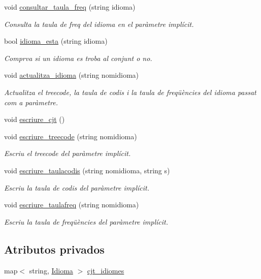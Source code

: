 \begin{DoxyCompactItemize}
void \hyperlink{class_cjt___idiomes_af0cfe6e69c1784af172fe825bdbe61f8}{consultar\+\_\+taula\+\_\+freq} (string idioma)
\begin{DoxyCompactList}\small\item\em Consulta la taula de freq del idioma en el paràmetre implícit. \end{DoxyCompactList}\item 
bool \hyperlink{class_cjt___idiomes_a4c46be5ecf3b12b3f481ace7d487fdc3}{idioma\+\_\+esta} (string idioma)
\begin{DoxyCompactList}\small\item\em Comprva si un idioma es troba al conjunt o no. \end{DoxyCompactList}\item 
void \hyperlink{class_cjt___idiomes_a7aad6974355b73c50c2d5c1edc0a5c14}{actualitza\+\_\+idioma} (string nomidioma)
\begin{DoxyCompactList}\small\item\em Actualitza el treecode, la taula de codis i la taula de freqüències del idioma passat com a paràmetre. \end{DoxyCompactList}\item 
void \hyperlink{class_cjt___idiomes_abdfd8226b0c00d4a3f5bab91b44a170f}{escriure\+\_\+cjt} ()
\item 
void \hyperlink{class_cjt___idiomes_a49666adf7e2a9cefc96d4b7b3d925710}{escriure\+\_\+treecode} (string nomidioma)
\begin{DoxyCompactList}\small\item\em Escriu el treecode del paràmetre implícit. \end{DoxyCompactList}\item 
void \hyperlink{class_cjt___idiomes_afdad5e96949152abf75a9598224be426}{escriure\+\_\+taulacodis} (string nomidioma, string s)
\begin{DoxyCompactList}\small\item\em Escriu la taula de codis del paràmetre implícit. \end{DoxyCompactList}\item 
void \hyperlink{class_cjt___idiomes_a98862ab41b59ac71eca4408e2b6bf6f0}{escriure\+\_\+taulafreq} (string nomidioma)
\begin{DoxyCompactList}\small\item\em Escriu la taula de freqüències del paràmetre implícit. \end{DoxyCompactList}\end{DoxyCompactItemize}
\subsection*{Atributos privados}
\begin{DoxyCompactItemize}
\item 
map$<$ string, \hyperlink{class_idioma}{Idioma} $>$ \hyperlink{class_cjt___idiomes_a1d294e628332477cbb3334cd8fb490a4}{cjt\+\_\+idiomes}
\end{DoxyCompactItemize}


